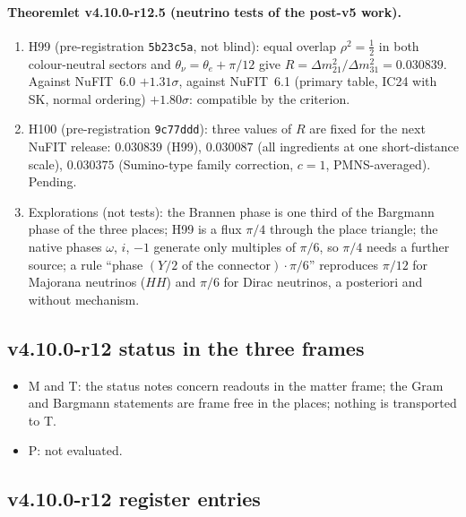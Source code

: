 \paragraph{Theoremlet v4.10.0-r12.5 (neutrino tests of the post-v5 work).}
\begin{enumerate}[leftmargin=2em]
\item[(a)] H99 (pre-registration \texttt{5b23c5a}, not blind): equal overlap \(\rho^2=\tfrac12\) in both colour-neutral sectors and
\(\theta_\nu=\theta_e+\pi/12\) give \(R=\Delta m^2_{21}/\Delta m^2_{31}=0.030839\).  Against NuFIT~6.0 \(+1.31\sigma\), against
NuFIT~6.1 (primary table, IC24 with SK, normal ordering) \(+1.80\sigma\): compatible by the criterion.
\item[(b)] H100 (pre-registration \texttt{9c77ddd}): three values of \(R\) are fixed for the next NuFIT release: \(0.030839\)
(H99), \(0.030087\) (all ingredients at one short-distance scale), \(0.030375\) (Sumino-type family correction, \(c=1\),
PMNS-averaged).  Pending.
\item[(c)] Explorations (not tests): the Brannen phase is one third of the Bargmann phase of the three places; H99 is a flux
\(\pi/4\) through the place triangle; the native phases \(\omega\), \(i\), \(-1\) generate only multiples of \(\pi/6\), so
\(\pi/4\) needs a further source; a rule ``phase \((Y/2\text{ of the connector})\cdot\pi/6\)'' reproduces \(\pi/12\) for
Majorana neutrinos (\(HH\)) and \(\pi/6\) for Dirac neutrinos, a posteriori and without mechanism.
\end{enumerate}

\subsection*{v4.10.0-r12 status in the three frames}
\label{subsec:v4100-r12-frames}

\begin{itemize}[leftmargin=2em]
\item M and T: the status notes concern readouts in the matter frame; the Gram and Bargmann statements are frame free in the
places; nothing is transported to T.
\item P: not evaluated.
\end{itemize}

\subsection*{v4.10.0-r12 register entries}
\label{subsec:v4100-r12-register}

